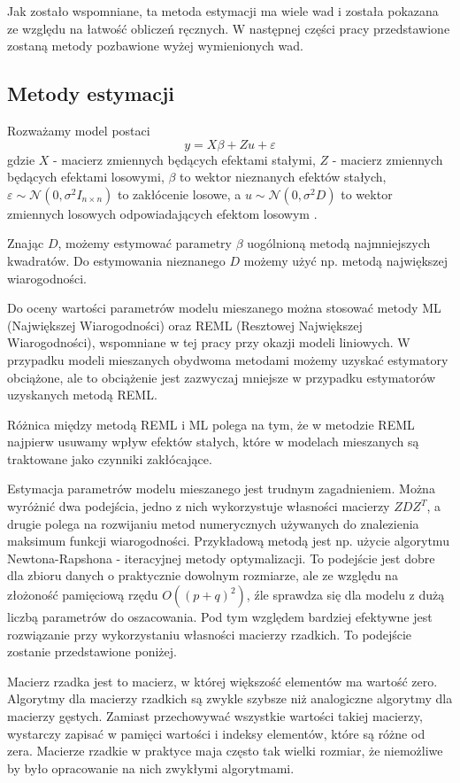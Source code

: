 \documentclass[12pt]{mwbk}
\theoremstyle{plain}
\theoremstyle{definition}
\theoremstyle{remark}
\begin{document}
Jak zostało wspomniane, ta metoda estymacji ma wiele wad i została pokazana ze względu na łatwość obliczeń ręcznych. W następnej części pracy przedstawione zostaną metody pozbawione wyżej wymienionych wad.

\subsection{Metody estymacji}

Rozważamy model postaci
$$y=X\beta +Z u + \varepsilon$$
gdzie $X$ - macierz zmiennych będących efektami stałymi, $Z$ - macierz zmiennych będących efektami losowymi, $\beta$ to wektor nieznanych efektów stałych, $\varepsilon \sim \mathcal{N}(0, \sigma^2 I_{n\times n})$ to zakłócenie losowe, a $u \sim \mathcal{N} (0, \sigma^2D)$ to wektor zmiennych losowych odpowiadających efektom losowym \cite{biecek}.

Znając $D$, możemy estymować parametry $\beta$ uogólnioną metodą najmniejszych kwadratów. Do estymowania nieznanego $D$ możemy użyć np. metodą największej wiarogodności.

Do oceny wartości parametrów modelu mieszanego można stosować metody ML (Największej Wiarogodności) oraz REML (Resztowej Największej Wiarogodności), wspomniane w tej pracy przy okazji modeli liniowych. W przypadku modeli mieszanych obydwoma metodami możemy uzyskać estymatory obciążone, ale to obciążenie jest zazwyczaj mniejsze w przypadku estymatorów uzyskanych metodą REML.

Różnica między metodą REML i ML polega na tym, że w metodzie REML najpierw usuwamy wpływ efektów stałych, które w modelach mieszanych są traktowane jako czynniki zakłócające.

Estymacja parametrów modelu mieszanego jest trudnym zagadnieniem. Można wyróżnić dwa podejścia, jedno z nich wykorzystuje własności macierzy $ZDZ^T$, a drugie polega na rozwijaniu metod numerycznych używanych do znalezienia maksimum funkcji wiarogodności. Przykładową metodą jest np. użycie algorytmu Newtona-Rapshona - iteracyjnej metody optymalizacji. To podejście jest dobre dla zbioru danych o praktycznie dowolnym rozmiarze, ale ze względu na złożoność pamięciową rzędu $O((p+q)^2)$, źle sprawdza się dla modelu z dużą liczbą parametrów do oszacowania. Pod tym względem bardziej efektywne jest rozwiązanie przy wykorzystaniu własności macierzy rzadkich. To podejście zostanie przedstawione poniżej.

Macierz rzadka jest to macierz, w której większość elementów ma wartość zero. Algorytmy dla macierzy rzadkich są zwykle szybsze niż analogiczne algorytmy dla macierzy gęstych. Zamiast przechowywać wszystkie wartości takiej macierzy, wystarczy zapisać w pamięci wartości i indeksy elementów, które są różne od zera. Macierze rzadkie w praktyce maja często tak wielki rozmiar, że niemożliwe by było opracowanie na nich zwykłymi algorytmami.
\end{document}
